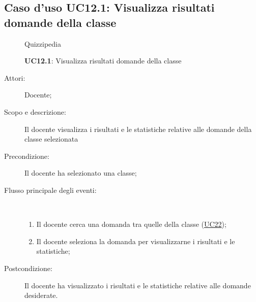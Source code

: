 \subsection{Caso d'uso UC12.1: Visualizza risultati domande della classe}
	\begin{figure}[H]
		\centering
		\begin{resizedtikzpicture}{\textwidth}
		\begin{umlsystem}[x=0, fill=lightgray!20]{Quizzipedia}
		\end{umlsystem}
		\end{resizedtikzpicture}
		\caption{\textbf{UC12.1}: Visualizza risultati domande della classe}
		\label{UC12.1}
	\end{figure}
\begin{description}
\item[Attori:] Docente;
\item[Scopo e descrizione:] Il docente visualizza i risultati e le statistiche relative alle domande della classe selezionata
      \item[Precondizione:] Il docente ha selezionato una classe;

        \item[Flusso principale degli eventi:] \ 
 \begin{enumerate}
          \item Il docente cerca una domanda tra quelle della classe (\hyperlink{UC22}{UC22});
          \item Il docente seleziona la domanda per visualizzarne i risultati e le statistiche;

      \end{enumerate}
    \item[Postcondizione:] Il docente ha visualizzato i risultati e le statistiche relative alle domande desiderate.
  \end{description}
\hypertarget{UC12.2}{}
